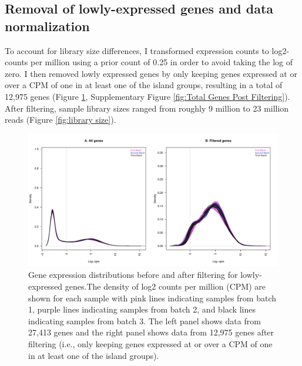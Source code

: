 \documentclass[12pt,a4paper,titlepage,twoside,openright]{book}
\begin{document}
\begin{mainmatter}
\section{Removal of lowly-expressed genes and data normalization}
To account for library size differences, I transformed expression counts to log2-counts per million using a prior count of 0.25 in order to avoid taking the log of zero. I then removed lowly expressed genes by only keeping genes expressed at or over a CPM of one in at least one of the island groups, resulting in a total of 12,975 genes (Figure \ref{fig:library density after removal of lowly-expressed genes}, Supplementary Figure \ref{fig:Total Genes Post Filtering}). After filtering, sample library sizes ranged from roughly 9 million to 23 million reads (Figure \ref{fig:library size}).

\begin{figure}[htb!]
\centering
\includegraphics[width=\textwidth,height=\textheight,keepaspectratio]{libraryDensity_afterFiltering_indoRNA.pdf}
\caption{Gene expression distributions before and after filtering for lowly-expressed genes.The density of log2 counts per million (CPM) are shown for each sample with pink lines indicating samples from batch 1, purple lines indicating samples from batch 2, and black lines indicating samples from batch 3. The left panel shows data from 27,413 genes and the right panel shows data from 12,975 genes after filtering (i.e., only keeping genes expressed at or over a CPM of one in at least one of the island groups).}
\label{fig:library density after removal of lowly-expressed genes}
\end{figure}


\end{mainmatter}
\end{document}
